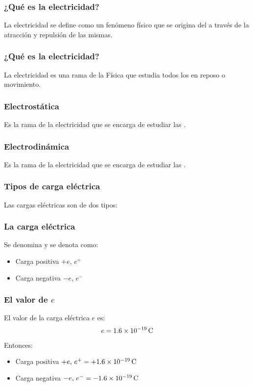 \documentclass[14pt]{beamer}
\begin{document}
\begin{frame}
\frametitle{¿Qué es la electricidad?}
La electricidad se define como un fenómeno físico que se origina del  a través de la atracción y repulsión de las mismas.
\end{frame}
\begin{frame}
\frametitle{¿Qué es la electricidad?}
La electricidad es una rama de la Física que estudia todos los  en reposo o movimiento.
\end{frame}
\begin{frame}
\frametitle{Electrostática}
Es la rama de la electricidad que se encarga de estudiar las .
\end{frame}
\begin{frame}
\frametitle{Electrodinámica}
Es la rama de la electricidad que se encarga de estudiar las .
\end{frame}
\begin{frame}
\frametitle{Tipos de carga eléctrica}
Las cargas eléctricas son de dos tipos:
\pause
\begin{figure}
    \centering
\end{figure}
\end{frame}
\begin{frame}
\frametitle{La carga eléctrica}
Se denomina  y se denota como:
\pause
\begin{itemize}
\item Carga positiva $+e$, $e^{+}$
\item Carga negativa $-e$, $e^{-}$
\end{itemize}
\end{frame}
\begin{frame}
\frametitle{El valor de $e$}
El valor de la carga eléctrica $e$ es:
\pause
\begin{align*}
e = \SI{1.6d-19}{\coulomb}
\end{align*}
\pause
Entonces:
\begin{itemize}
\item Carga positiva $+e, \, e^{+} = + \SI{1.6d-19}{\coulomb}$
\item Carga negativa $-e, \, e^{-} = -\SI{1.6d-19}{\coulomb}$
\end{itemize}    
\end{frame}
\end{document}
